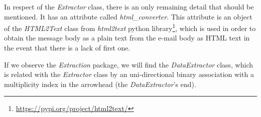In respect of the \textit{Extractor} class, there is an only remaining detail that should be mentioned. It has an attribute called \textit{html\_converter}. This attribute is an object of the \textit{HTML2Text} class from \textit{html2text} python library\footnote{\url{https://pypi.org/project/html2text/}}, which is used in order to obtain the message body as a plain text from the e-mail body as HTML text in the event that there is a lack of first one.

If we observe the \textit{Extraction} package, we will find the \textit{DataExtractor} class, which is related with the \textit{Extractor} class by an uni-directional binary association with a multiplicity index in the arrowhead (the \textit{DataExtractor}'s end).